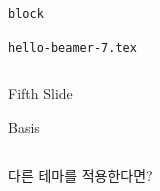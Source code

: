 \documentclass[compress]{beamer}
\begin{document}
\begin{frame}[fragile=singleslide,allowframebreaks]{\texttt{block}}
  \begin{block}{\texttt{hello-beamer-7.tex}}
    \begin{columns}
      \begin{column}{0.6\textwidth}
        \begin{latexcode}
          \begin{frame}{Fifth Slide}
            \begin{block}{Basis}
            \end{block}
            \begin{theorem}
            \end{theorem}
          \end{frame}
        \end{latexcode}
      \end{column}
    \end{columns}
  \end{block}
  다른 테마를 적용한다면?
\end{frame}
\end{document}
